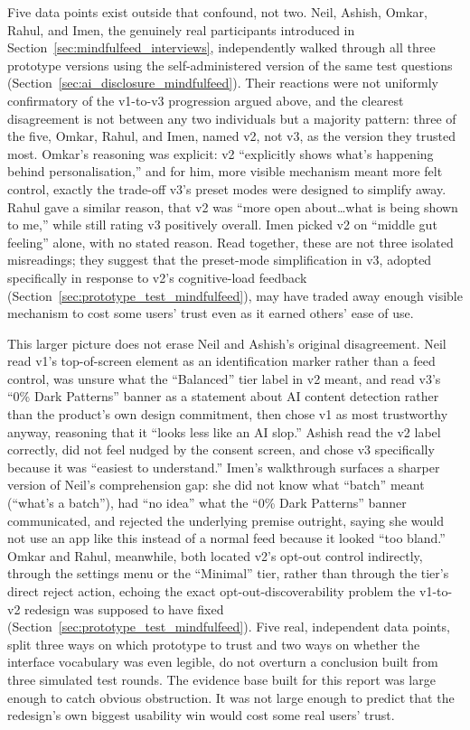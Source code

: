 \documentclass[11pt]{article}
\begin{document}
Five data points exist outside that confound, not two. Neil, Ashish, Omkar, Rahul, and Imen, the genuinely real participants introduced in Section~\ref{sec:mindfulfeed_interviews}, independently walked through all three prototype versions using the self-administered version of the same test questions (Section~\ref{sec:ai_disclosure_mindfulfeed}). Their reactions were not uniformly confirmatory of the v1-to-v3 progression argued above, and the clearest disagreement is not between any two individuals but a majority pattern: three of the five, Omkar, Rahul, and Imen, named v2, not v3, as the version they trusted most. Omkar's reasoning was explicit: v2 ``explicitly shows what's happening behind personalisation,'' and for him, more visible mechanism meant more felt control, exactly the trade-off v3's preset modes were designed to simplify away. Rahul gave a similar reason, that v2 was ``more open about\ldots what is being shown to me,'' while still rating v3 positively overall. Imen picked v2 on ``middle gut feeling'' alone, with no stated reason. Read together, these are not three isolated misreadings; they suggest that the preset-mode simplification in v3, adopted specifically in response to v2's cognitive-load feedback (Section~\ref{sec:prototype_test_mindfulfeed}), may have traded away enough visible mechanism to cost some users' trust even as it earned others' ease of use.

This larger picture does not erase Neil and Ashish's original disagreement. Neil read v1's top-of-screen element as an identification marker rather than a feed control, was unsure what the ``Balanced'' tier label in v2 meant, and read v3's ``0\% Dark Patterns'' banner as a statement about AI content detection rather than the product's own design commitment, then chose v1 as most trustworthy anyway, reasoning that it ``looks less like an AI slop.'' Ashish read the v2 label correctly, did not feel nudged by the consent screen, and chose v3 specifically because it was ``easiest to understand.'' Imen's walkthrough surfaces a sharper version of Neil's comprehension gap: she did not know what ``batch'' meant (``what's a batch''), had ``no idea'' what the ``0\% Dark Patterns'' banner communicated, and rejected the underlying premise outright, saying she would not use an app like this instead of a normal feed because it looked ``too bland.'' Omkar and Rahul, meanwhile, both located v2's opt-out control indirectly, through the settings menu or the ``Minimal'' tier, rather than through the tier's direct reject action, echoing the exact opt-out-discoverability problem the v1-to-v2 redesign was supposed to have fixed (Section~\ref{sec:prototype_test_mindfulfeed}). Five real, independent data points, split three ways on which prototype to trust and two ways on whether the interface vocabulary was even legible, do not overturn a conclusion built from three simulated test rounds. The evidence base built for this report was large enough to catch obvious obstruction. It was not large enough to predict that the redesign's own biggest usability win would cost some real users' trust.
\end{document}
